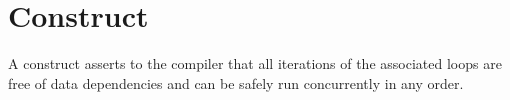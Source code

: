 %
%
%
%
%
%
%
%
%
%
%
%
%

\section{ Construct}
\label{sec:concurrent Construct}
\summary
  A  construct asserts to the compiler that all iterations of
  the associated loops are free of data dependencies and can be safely run
  concurrently in any order.

